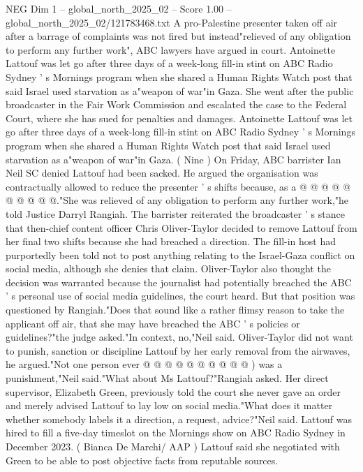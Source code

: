 \begin{textsample}{NEG Dim 1 – global\_north\_2025\_02 – Score 1.00 – global\_north\_2025\_02/121783468.txt}  \label{ex:f1_neg_014}
A pro-Palestine presenter taken off air after a barrage of complaints was not fired but instead"relieved of any obligation to perform any further work", ABC lawyers have argued in court.
Antoinette Lattouf was let go after three days of a week-long fill-in stint on ABC Radio Sydney ' s Mornings program when she shared a Human Rights Watch post that said Israel used starvation as a"weapon of war"in Gaza.
She went after the public broadcaster in the Fair Work Commission and escalated the case to the Federal Court, where she has sued for penalties and damages.
Antoinette Lattouf was let go after three days of a week-long fill-in stint on ABC Radio Sydney ' s Mornings program when she shared a Human Rights Watch post that said Israel used starvation as a"weapon of war"in Gaza. ( Nine ) On Friday, ABC barrister Ian Neil SC denied Lattouf had been sacked.
He argued the organisation was contractually allowed to reduce the presenter ' s shifts because, as a @ @ @ @ @ @ @ @ @ @."She was relieved of any obligation to perform any further work,"he told Justice Darryl Rangiah.
The barrister reiterated the broadcaster ' s stance that then-chief content officer Chris Oliver-Taylor decided to remove Lattouf from her final two shifts because she had breached a direction.
The fill-in host had purportedly been told not to post anything relating to the Israel-Gaza conflict on social media, although she denies that claim.
Oliver-Taylor also thought the decision was warranted because the journalist had potentially breached the ABC ' s personal use of social media guidelines, the court heard.
But that position was questioned by Rangiah."Does that sound like a rather flimsy reason to take the applicant off air, that she may have breached the ABC ' s policies or guidelines?"the judge asked."In context, no,"Neil said.
Oliver-Taylor did not want to punish, sanction or discipline Lattouf by her early removal from the airwaves, he argued."Not one person ever @ @ @ @ @ @ @ @ @ @ ) was a punishment,"Neil said."What about Ms Lattouf?"Rangiah asked.
Her direct supervisor, Elizabeth Green, previously told the court she never gave an order and merely advised Lattouf to lay low on social media."What does it matter whether somebody labels it a direction, a request, advice?"Neil said.
Lattouf was hired to fill a five-day timeslot on the Mornings show on ABC Radio Sydney in December 2023. ( Bianca De Marchi/ AAP ) Lattouf said she negotiated with Green to be able to post objective facts from reputable sources.

\end{textsample}
